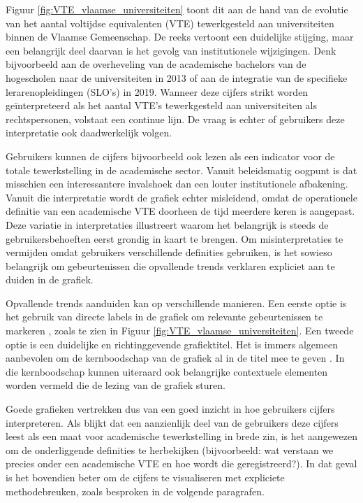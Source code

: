 \documentclass{VSAnote}
\begin{document}
Figuur \ref{fig:VTE_vlaamse_universiteiten} toont dit aan de hand van de evolutie van het aantal voltijdse equivalenten (VTE) tewerkgesteld aan universiteiten binnen de Vlaamse Gemeenschap. De reeks vertoont een duidelijke stijging, maar een belangrijk deel daarvan is het gevolg van institutionele wijzigingen. Denk bijvoorbeeld aan de overheveling van de academische bachelors van de hogescholen naar de universiteiten in 2013 of aan de integratie van de specifieke lerarenopleidingen (SLO’s) in 2019. Wanneer deze cijfers strikt worden geïnterpreteerd als het aantal VTE’s tewerkgesteld aan universiteiten als rechtspersonen, volstaat een continue lijn. De vraag is echter of gebruikers deze interpretatie ook daadwerkelijk volgen.

Gebruikers kunnen de cijfers bijvoorbeeld ook lezen als een indicator voor de totale tewerkstelling in de academische sector. Vanuit beleidsmatig oogpunt is dat misschien een interessantere invalshoek dan een louter institutionele afbakening. Vanuit die interpretatie wordt de grafiek echter misleidend, omdat de operationele definitie van een academische VTE doorheen de tijd meerdere keren is aangepast. Deze variatie in interpretaties illustreert waarom het belangrijk is steeds de gebruikersbehoeften eerst grondig in kaart te brengen. Om misinterpretaties te vermijden omdat gebruikers verschillende definities gebruiken, is het sowieso belangrijk om gebeurtenissen die opvallende trends verklaren expliciet aan te duiden in de grafiek.

Opvallende trends aanduiden kan op verschillende manieren. Een eerste optie is het gebruik van directe labels in de grafiek om relevante gebeurtenissen te markeren \parencite{doumont2009Trees, vandenEeckhout2022Powerful}, zoals te zien in Figuur \ref{fig:VTE_vlaamse_universiteiten}. Een tweede optie is een duidelijke en richtinggevende grafiektitel. Het is immers algemeen aanbevolen om de kernboodschap van de grafiek al in de titel mee te geven \parencite{evergreen2019Effective, doumont2009Trees, vandenEeckhout2022Powerful}. In die kernboodschap kunnen uiteraard ook belangrijke contextuele elementen worden vermeld die de lezing van de grafiek sturen.

Goede grafieken vertrekken dus van een goed inzicht in hoe gebruikers cijfers interpreteren. Als blijkt dat een aanzienlijk deel van de gebruikers deze cijfers leest als een maat voor academische tewerkstelling in brede zin, is het aangewezen om de onderliggende definities te herbekijken (bijvoorbeeld: wat verstaan we precies onder een academische VTE en hoe wordt die geregistreerd?). In dat geval is het bovendien beter om de cijfers te visualiseren met expliciete methodebreuken, zoals besproken in de volgende paragrafen.
\end{document}

